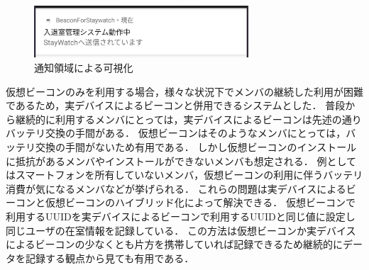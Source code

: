  

\begin{figure}[tbh]
  \centering
  \includegraphics[width=8cm]{image/notify.jpg}
  \caption{通知領域による可視化}
  \label{multipleBPM}
\end{figure}



仮想ビーコンのみを利用する場合，様々な状況下でメンバの継続した利用が困難であるため，実デバイスによるビーコンと併用できるシステムとした．
 普段から継続的に利用するメンバにとっては，実デバイスによるビーコンは先述の通りバッテリ交換の手間がある．
仮想ビーコンはそのようなメンバにとっては，バッテリ交換の手間がないため有用である．
 しかし仮想ビーコンのインストールに抵抗があるメンバやインストールができないメンバも想定される．
例としてはスマートフォンを所有していないメンバ，仮想ビーコンの利用に伴うバッテリ消費が気になるメンバなどが挙げられる．
 これらの問題は実デバイスによるビーコンと仮想ビーコンのハイブリッド化によって解決できる． 
仮想ビーコンで利用するUUIDを実デバイスによるビーコンで利用するUUIDと同じ値に設定し同じユーザの在室情報を記録している．
この方法は仮想ビーコンか実デバイスによるビーコンの少なくとも片方を携帯していれば記録できるため継続的にデータを記録する観点から見ても有用である．

